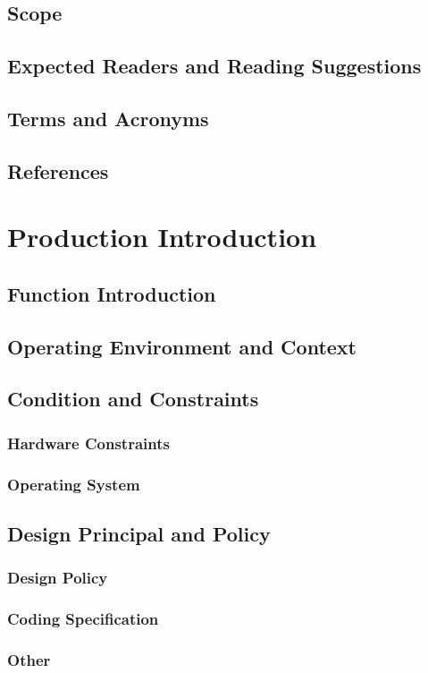 \documentclass[11pt,letterpaper]{report}
\begin{document}
\section{Scope}
\section{Expected Readers and Reading Suggestions}
\section{Terms and Acronyms}
\section{References}

\chapter{Production Introduction}
\section{Function Introduction}
\section{Operating Environment and Context}
\section{Condition and Constraints}
\subsection{Hardware Constraints}
\subsection{Operating System}
\section{Design Principal and Policy}
\subsection{Design Policy}
\subsection{Coding Specification}
\subsection{Other}
\end{document}
